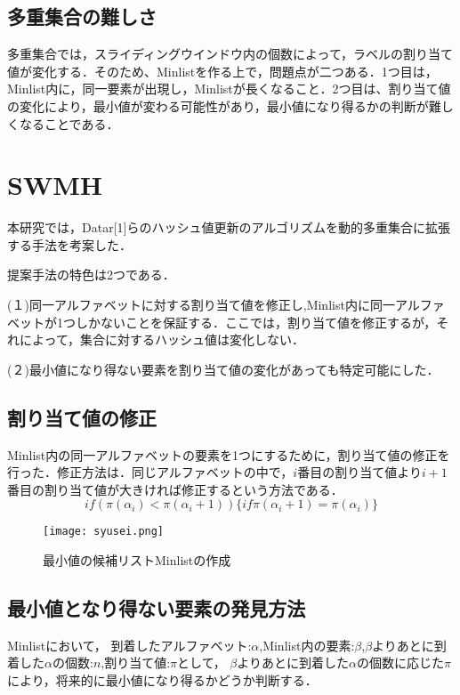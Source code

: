 \documentclass[a4j,twocolumn,dvipdfmx,autodetect-engine]{jsarticle}
\begin{document}
  
  
\subsection{多重集合の難しさ}
多重集合では，スライディングウインドウ内の個数によって，ラベルの割り当て値が変化する．そのため、Minlistを作る上で，問題点が二つある．1つ目は，Minlist内に，同一要素が出現し，Minlistが長くなること．2つ目は、割り当て値の変化により，最小値が変わる可能性があり，最小値になり得るかの判断が難しくなることである．


\section{SWMH}
本研究では，Datar[1]らのハッシュ値更新のアルゴリズムを動的多重集合に拡張する手法を考案した．

提案手法の特色は2つである．

(１)同一アルファベットに対する割り当て値を修正し,Minlist内に同一アルファベットが1つしかないことを保証する．ここでは，割り当て値を修正するが，それによって，集合に対するハッシュ値は変化しない．

(２)最小値になり得ない要素を割り当て値の変化があっても特定可能にした．

\subsection{割り当て値の修正}
Minlist内の同一アルファベットの要素を1つにするために，割り当て値の修正を行った．修正方法は．同じアルファベットの中で，$i$番目の割り当て値より$i+1$番目の割り当て値が大きければ修正するという方法である．
\begin{equation}
if (\pi(\alpha_i)<\pi(\alpha_i+1))\{
if \pi(\alpha_i+1)=\pi(\alpha_i)
\}
\end{equation}


\begin{figure}[H]
  \centering
  \texttt{[image: syusei.png]}
  \caption{最小値の候補リストMinlistの作成}
\end{figure}

\subsection{最小値となり得ない要素の発見方法}
Minlistにおいて，
到着したアルファベット:$\alpha$,Minlist内の要素:$\beta$,$\beta$よりあとに到着した$\alpha$の個数:$n$,割り当て値:$\pi$として，
$\beta$よりあとに到着した$\alpha$の個数に応じた$\pi$により，将来的に最小値になり得るかどうか判断する．
\end{document}
